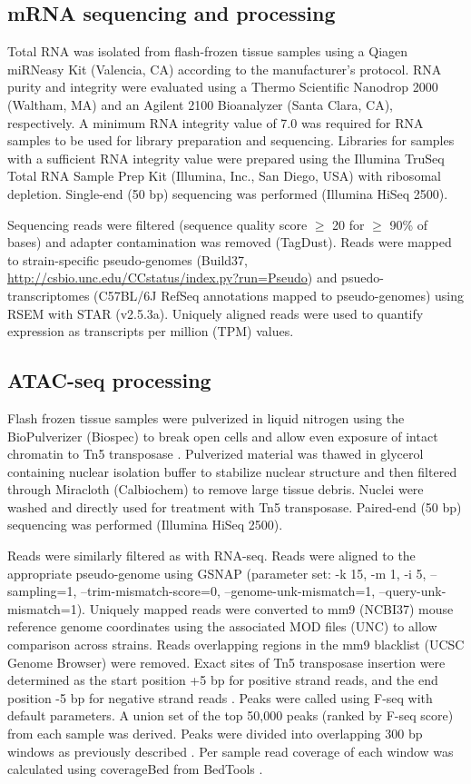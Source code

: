 \documentclass[9pt,twocolumn,twoside]{gsajnl}
\begin{document}
\subsection{mRNA sequencing and processing}

Total RNA was isolated from flash-frozen tissue samples using a Qiagen miRNeasy Kit (Valencia, CA) according to the manufacturer’s protocol. RNA purity and integrity were evaluated using a Thermo Scientific Nanodrop 2000 (Waltham, MA) and an Agilent 2100 Bioanalyzer (Santa Clara, CA), respectively. A minimum RNA integrity value of 7.0 was required for RNA samples to be used for library preparation and sequencing. Libraries for samples with a sufficient RNA integrity value were prepared using the Illumina TruSeq Total RNA Sample Prep Kit (Illumina, Inc., San Diego, USA) with ribosomal depletion. Single-end (50 bp) sequencing was performed (Illumina HiSeq 2500).

Sequencing reads were filtered (sequence quality score $\ge$ 20 for $\ge$ 90\% of bases) and adapter contamination was removed (TagDust). Reads were mapped to strain-specific pseudo-genomes (Build37, \url{http://csbio.unc.edu/CCstatus/index.py?run=Pseudo}) and psuedo-transcriptomes (C57BL/6J RefSeq annotations mapped to pseudo-genomes) using RSEM with STAR (v2.5.3a). Uniquely aligned reads  were used to quantify expression as transcripts per million (TPM) values.

\subsection{ATAC-seq processing}

Flash frozen tissue samples were pulverized in liquid nitrogen using the BioPulverizer (Biospec) to break open cells and allow even exposure of intact chromatin to Tn5 transposase \citep{Buenrostro2015}. Pulverized material was thawed in glycerol containing nuclear isolation buffer to stabilize nuclear structure and then filtered through Miracloth (Calbiochem) to remove large tissue debris. Nuclei were washed and directly used for treatment with Tn5 transposase. Paired-end (50 bp) sequencing was performed (Illumina HiSeq 2500).

Reads were similarly filtered as with RNA-seq. Reads were aligned to the appropriate pseudo-genome using GSNAP (parameter set: -k 15, -m 1, -i 5, –sampling=1, –trim-mismatch-score=0, –genome-unk-mismatch=1, –query-unk-mismatch=1). Uniquely mapped reads were converted to mm9 (NCBI37) mouse reference genome coordinates using the associated MOD files (UNC) to allow comparison across strains. Reads overlapping regions in the mm9 blacklist (UCSC Genome Browser) were removed. Exact sites of Tn5 transposase insertion were determined as the start position +5 bp for positive strand reads, and the end position -5 bp for negative strand reads \citep{Buenrostro2013}. Peaks were called using F-seq with default parameters. A union set of the top 50,000 peaks (ranked by F-seq score) from each sample was derived. Peaks were divided into overlapping 300 bp windows as previously described \citep{Shibata2012}. Per sample read coverage of each window was calculated using coverageBed from BedTools \citep{Quinlan2010}.
\end{document}
